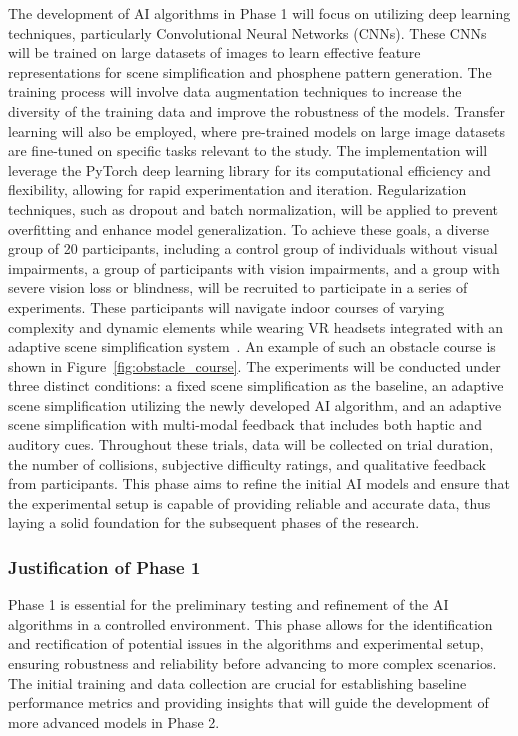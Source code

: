 \documentclass[10pt]{article}
\begin{document}
The development of AI algorithms in Phase 1 will focus on utilizing deep
learning techniques, particularly Convolutional Neural Networks (CNNs). These
CNNs will be trained on large datasets of images to learn effective feature
representations for scene simplification and phosphene pattern generation. The
training process will involve data augmentation techniques to increase the
diversity of the training data and improve the robustness of the models.
Transfer learning will also be employed, where pre-trained models on large image
datasets are fine-tuned on specific tasks relevant to the study. The
implementation will leverage the PyTorch deep learning library for its
computational efficiency and flexibility, allowing for rapid experimentation and
iteration. Regularization techniques, such as dropout and batch normalization,
will be applied to prevent overfitting and enhance model generalization. To
achieve these goals, a diverse group of 20 participants, including a control
group of individuals without visual impairments, a group of participants with
vision impairments, and a group with severe vision loss or blindness, will be
recruited to participate in a series of experiments. These participants will
navigate indoor courses of varying complexity and dynamic elements while wearing
VR headsets integrated with an adaptive scene simplification
system~\parencite{deruytervansteveninckRealworldIndoorMobility2022}. An example
of such an obstacle course is shown in Figure~\ref{fig:obstacle_course}. The
experiments will be conducted under three distinct conditions: a fixed scene
simplification as the baseline, an adaptive scene simplification utilizing the
newly developed AI algorithm, and an adaptive scene simplification with
multi-modal feedback that includes both haptic and auditory cues. Throughout
these trials, data will be collected on trial duration, the number of
collisions, subjective difficulty ratings, and qualitative feedback from
participants. This phase aims to refine the initial AI models and ensure that
the experimental setup is capable of providing reliable and accurate data, thus
laying a solid foundation for the subsequent phases of the research.

\subsubsection*{Justification of Phase 1}
Phase 1 is essential for the preliminary testing and refinement of the AI
algorithms in a controlled environment. This phase allows for the identification
and rectification of potential issues in the algorithms and experimental setup,
ensuring robustness and reliability before advancing to more complex scenarios.
The initial training and data collection are crucial for establishing baseline
performance metrics and providing insights that will guide the development of
more advanced models in Phase 2.
\end{document}
